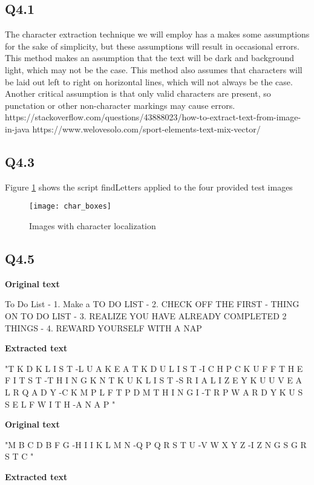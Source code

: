 \documentclass[12pt]{article}
\begin{document}
\subsection{Q4.1}
The character extraction technique we will employ has a makes some assumptions for the sake of simplicity, but these assumptions will result in occasional errors. This method makes an assumption that the text will be dark and background light, which may not be the case. This method also assumes that characters will be laid out left to right on horizontal lines, which will not always be the case. Another critical assumption is that only valid characters are present, so punctation or other non-character markings may cause errors.
https://stackoverflow.com/questions/43888023/how-to-extract-text-from-image-in-java
https://www.welovesolo.com/sport-elements-text-mix-vector/
\subsection{Q4.3}
Figure \ref{fig:charboxes} shows the script findLetters applied to the four provided test images

\begin{figure}[H]
\centering
\texttt{[image: char\_boxes]}
\caption{Images with character localization} 
\label{fig:charboxes}
\end{figure}   


\subsection{Q4.5}
\textbf { Original text }
 
To Do List  - 1. Make a TO DO LIST  - 2. CHECK OFF THE FIRST - THING ON TO DO LIST - 3. REALIZE YOU HAVE ALREADY COMPLETED 2 THINGS - 4. REWARD YOURSELF WITH A NAP

\bigskip

\textbf { Extracted text }

"T K D K L I S T -L U A K E A T K D U L I S T -I C H P C K U F F T H E F I T S T -T H I N G K N T K U K L I S T -S R I A L I Z E Y K U U V E A L R Q A D Y -C K M P L F T P D M T H I N G I -T R P W A R D Y K U S S E L F W I T H -A N A P "


\bigskip

\textbf { Original text }

"M B C D B F G -H I I K L M N -Q P Q R S T U -V W X Y Z -I Z N G S G R S T C "

\bigskip

\textbf { Extracted text }
\end{document}
